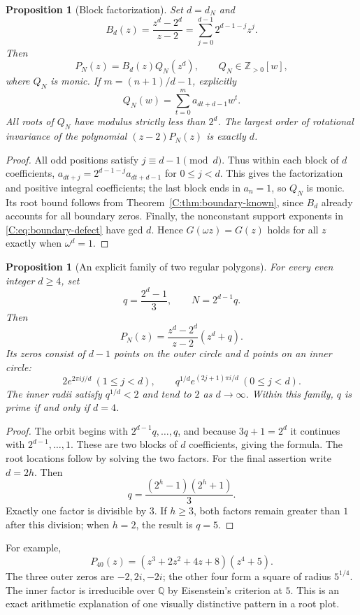 \documentclass[11pt,a4paper]{article}
\newtheorem{proposition}[theorem]{Proposition}
\theoremstyle{definition}
\theoremstyle{remark}
\numberwithin{equation}{section}
\begin{document}
\begin{proposition}[Block factorization]\label{C:prop:boundary-block}
Set $d=d_N$ and
\[
 B_d(z)=\frac{z^d-2^d}{z-2}
       =\sum_{j=0}^{d-1}2^{d-1-j}z^j.
\]
Then
\[
 P_N(z)=B_d(z)Q_N(z^d),
 \qquad Q_N\in\mathbb Z_{>0}[w],
\]
where $Q_N$ is monic. If $m=(n+1)/d-1$, explicitly
\[
 Q_N(w)=\sum_{t=0}^{m}a_{dt+d-1}w^t.
\]
All roots of $Q_N$ have modulus strictly less than $2^d$.
The largest order of rotational invariance of the polynomial
$(z-2)P_N(z)$ is exactly $d$.
\end{proposition}

\begin{proof}
All odd positions satisfy $j\equiv d-1\pmod d$. Thus within each
block of $d$ coefficients,
$a_{dt+j}=2^{d-1-j}a_{dt+d-1}$ for $0\le j<d$.
This gives the factorization and positive integral coefficients; the
last block ends in $a_n=1$, so $Q_N$ is monic. Its root bound follows
from Theorem~\ref{C:thm:boundary-known}, since $B_d$ already accounts for
all boundary zeros. Finally, the nonconstant support exponents in
\eqref{C:eq:boundary-defect} have gcd $d$. Hence
$G(\omega z)=G(z)$ holds for all $z$ exactly when $\omega^d=1$.
\end{proof}

\begin{proposition}[An explicit family of two regular polygons]
For every even integer $d\ge4$, set
\[
 q=\frac{2^d-1}{3},\qquad N=2^{d-1}q.
\]
Then
\[
 \boxed{P_N(z)=\frac{z^d-2^d}{z-2}(z^d+q).}
\]
Its zeros consist of $d-1$ points on the outer circle and $d$ points
on an inner circle:
\[
 2e^{2\pi i j/d}\ (1\le j<d),\qquad
 q^{1/d}e^{(2j+1)\pi i/d}\ (0\le j<d).
\]
The inner radii satisfy $q^{1/d}<2$ and tend to $2$ as $d\to\infty$.
Within this family, $q$ is prime if and only if $d=4$.
\end{proposition}

\begin{proof}
The orbit begins with $2^{d-1}q,\ldots,q$, and because $3q+1=2^d$
it continues with $2^{d-1},\ldots,1$. These are two blocks of $d$
coefficients, giving the formula. The root locations follow by solving
the two factors. For the final assertion write $d=2h$. Then
\[
 q=\frac{(2^h-1)(2^h+1)}3.
\]
Exactly one factor is divisible by $3$. If $h\ge3$, both factors
remain greater than $1$ after this division; when $h=2$, the result
is $q=5$.
\end{proof}

For example,
\[
 P_{40}(z)=(z^3+2z^2+4z+8)(z^4+5).
\]
The three outer zeros are $-2,2i,-2i$; the other four form a square
of radius $5^{1/4}$. The inner factor is irreducible over $\mathbb Q$
by Eisenstein's criterion at $5$. This is an exact arithmetic explanation
of one visually distinctive pattern in a root plot.
\end{document}
